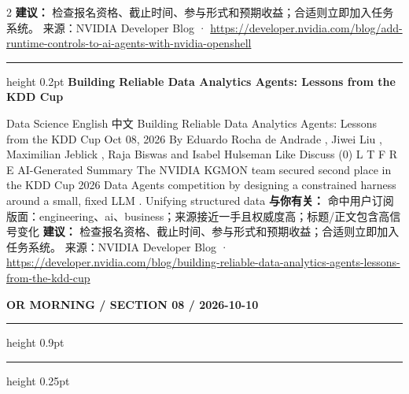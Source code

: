 \documentclass[10.5pt]{ctexart}
\begin{document}
\begin{multicols}{2}
\textbf{建议：} 检查报名资格、截止时间、参与形式和预期收益；合适则立即加入任务系统。
{\footnotesize\color{ormuted} 来源：NVIDIA Developer Blog · \url{https://developer.nvidia.com/blog/add-runtime-controls-to-ai-agents-with-nvidia-openshell}}
\vspace{2mm}
\hrule height 0.2pt
\vspace{2mm}
{\large\bfseries Building Reliable Data Analytics Agents: Lessons from the KDD Cup}\par
Data Science English 中文 Building Reliable Data Analytics Agents: Lessons from the KDD Cup Oct 08, 2026 By Eduardo Rocha de Andrade , Jiwei Liu , Maximilian Jeblick , Raja Biswas and Isabel Hulseman Like Discuss (0) L T F R E AI-Generated Summary The NVIDIA KGMON team secured second place in the KDD Cup 2026 Data Agents competition by designing a constrained harness around a small, fixed LLM . Unifying structured data
\textbf{与你有关：} 命中用户订阅版面：engineering、ai、business；来源接近一手且权威度高；标题/正文包含高信号变化
\textbf{建议：} 检查报名资格、截止时间、参与形式和预期收益；合适则立即加入任务系统。
{\footnotesize\color{ormuted} 来源：NVIDIA Developer Blog · \url{https://developer.nvidia.com/blog/building-reliable-data-analytics-agents-lessons-from-the-kdd-cup}}
\end{multicols}
\newpage
{\small\bfseries OR MORNING / SECTION 08 / 2026-10-10}
\vspace{2mm}
\hrule height 0.9pt
\vspace{1.5mm}
\hrule height 0.25pt
\vspace{4mm}
\end{document}
